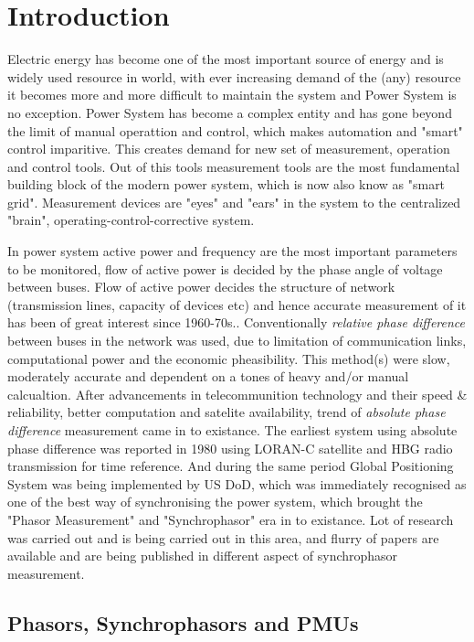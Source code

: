 \chapter{Introduction}
\setcounter{page}{1}

Electric energy has become one of the most important source of energy and is widely used resource in world, with ever increasing demand of the (any) resource it becomes more and more difficult to maintain the system and Power System is no exception. Power System has become a complex entity and has gone beyond the limit of manual operattion and control, which makes automation and "smart" control imparitive. This creates demand for new set of measurement, operation and control tools. Out of this tools measurement tools are the most fundamental building block of the modern power system, which is now also know as "smart grid". Measurement devices are "eyes" and "ears" in the system to the centralized "brain", operating-control-corrective system.  

In power system active power and frequency are the most important parameters to be monitored, flow of active power is decided by the phase angle of voltage between buses. Flow of active power decides the structure of network (transmission lines, capacity of devices etc) and hence accurate measurement of it has been of great interest since 1960-70s.\cite{agphadkebook}. Conventionally \textit{relative phase difference} between buses in the network was used, due to limitation of communication links, computational power and the economic pheasibility. This method(s) were slow, moderately accurate and dependent on a tones of heavy and/or manual calcualtion. 
After advancements in telecommunition technology and their speed \& reliability, better computation and satelite availability, trend of \textit{absolute phase difference} measurement came in to existance. The earliest system using absolute phase difference was reported in 1980 using LORAN-C satellite and HBG radio transmission for time reference. And during the same period Global Positioning System was being implemented by US DoD, which was immediately recognised as one of the best way of synchronising the power system, which brought the "Phasor Measurement" and "Synchrophasor" era in to existance. Lot of research was carried out and is being carried out in this area, and flurry of papers are available and are being published in different aspect of synchrophasor measurement. 
\section{Phasors, Synchrophasors and PMUs}
